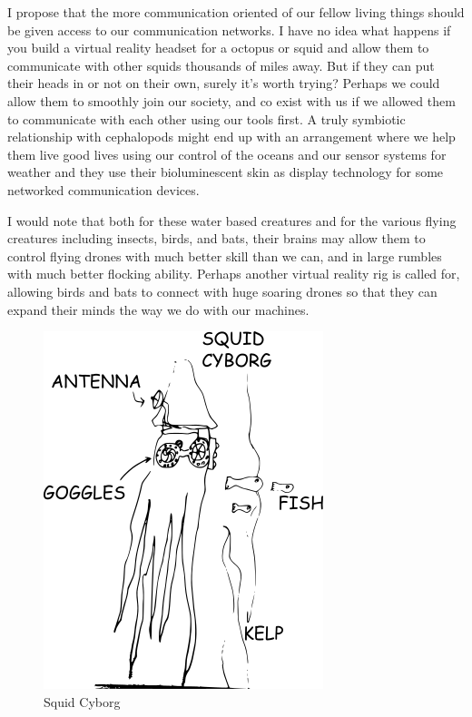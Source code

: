 I propose that the more communication oriented of our fellow living
things should be given access to our communication networks. I have no
idea what happens if you build a virtual reality headset for a octopus
or squid and allow them to communicate with other squids thousands of
miles away. But if they can put their heads in or not on their own,
surely it's worth trying? Perhaps we could allow them to smoothly join
our society, and co exist with us if we allowed them to communicate with
each other using our tools first. A truly symbiotic relationship with
cephalopods might end up with an arrangement where we help them live
good lives using our control of the oceans and our sensor systems for
weather and they use their bioluminescent skin as display technology for
some networked communication devices.

I would note that both for these water based creatures and for the
various flying creatures including insects, birds, and bats, their
brains may allow them to control flying drones with much better skill
than we can, and in large rumbles with much better flocking ability.
Perhaps another virtual reality rig is called for, allowing birds and
bats to connect with huge soaring drones so that they can expand their
minds the way we do with our machines.

\begin{figure}[htbp]
\centering
\includegraphics{images/squidcyborg.png}
\caption{Squid Cyborg}
\end{figure}

